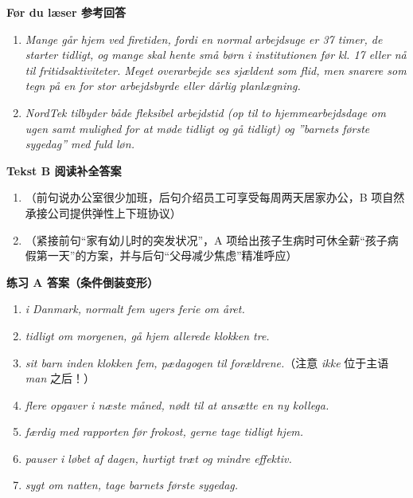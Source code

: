 \begin{answerbox}
\textbf{Før du læser 参考回答}
\begin{enumerate}
  \item \textit{Mange går hjem ved firetiden, fordi en normal arbejdsuge er 37 timer, de starter tidligt, og mange skal hente små børn i institutionen før kl. 17 eller nå til fritidsaktiviteter. Meget overarbejde ses sjældent som flid, men snarere som tegn på en for stor arbejdsbyrde eller dårlig planlægning.}
  \item \textit{NordTek tilbyder både fleksibel arbejdstid (op til to hjemmearbejdsdage om ugen samt mulighed for at møde tidligt og gå tidligt) og ”barnets første sygedag” med fuld løn.}
\end{enumerate}

\textbf{Tekst B 阅读补全答案}
\begin{enumerate}
  \item {}（前句说办公室很少加班，后句介绍员工可享受每周两天居家办公，B 项自然承接公司提供弹性上下班协议）
  \item {}（紧接前句“家有幼儿时的突发状况”，A 项给出孩子生病时可休全薪“孩子病假第一天”的方案，并与后句“父母减少焦虑”精准呼应）
\end{enumerate}

\textbf{练习 A 答案（条件倒装变形）}
\begin{enumerate}
  \item \textit{ i Danmark,  normalt fem ugers ferie om året.}
  \item \textit{ tidligt om morgenen,  gå hjem allerede klokken tre.}
  \item \textit{  sit barn inden klokken fem,  pædagogen til forældrene.}（注意 \textit{ikke} 位于主语 \textit{man} 之后！）
  \item \textit{ flere opgaver i næste måned,  nødt til at ansætte en ny kollega.}
  \item \textit{ færdig med rapporten før frokost,  gerne tage tidligt hjem.}
  \item \textit{  pauser i løbet af dagen,  hurtigt træt og mindre effektiv.}
  \item \textit{ sygt om natten,  tage barnets første sygedag.}
\end{enumerate}


\end{answerbox}
